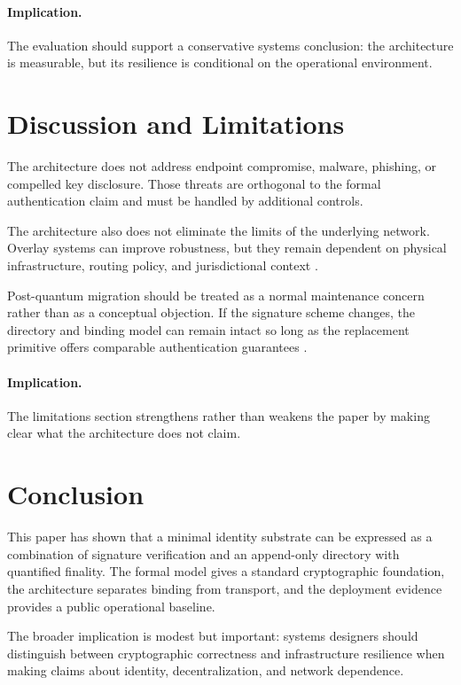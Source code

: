 \documentclass[11pt,a4paper]{article}
\begin{document}
\paragraph{Implication.} The evaluation should support a conservative systems conclusion: the architecture is measurable, but its resilience is conditional on the operational environment.

\section{Discussion and Limitations}

The architecture does not address endpoint compromise, malware, phishing, or compelled key disclosure. Those threats are orthogonal to the formal authentication claim and must be handled by additional controls.

The architecture also does not eliminate the limits of the underlying network. Overlay systems can improve robustness, but they remain dependent on physical infrastructure, routing policy, and jurisdictional context \cite{iso1994,cerf1974,gill2015}.

Post-quantum migration should be treated as a normal maintenance concern rather than as a conceptual objection. If the signature scheme changes, the directory and binding model can remain intact so long as the replacement primitive offers comparable authentication guarantees \cite{fips204}.

\paragraph{Implication.} The limitations section strengthens rather than weakens the paper by making clear what the architecture does not claim.

\section{Conclusion}

This paper has shown that a minimal identity substrate can be expressed as a combination of signature verification and an append-only directory with quantified finality. The formal model gives a standard cryptographic foundation, the architecture separates binding from transport, and the deployment evidence provides a public operational baseline.

The broader implication is modest but important: systems designers should distinguish between cryptographic correctness and infrastructure resilience when making claims about identity, decentralization, and network dependence.
\end{document}
